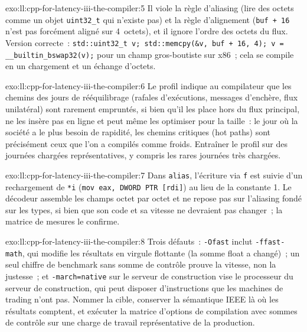 \begin{solution}{exo:ll:cpp-for-latency-iii-the-compiler:5} \sloppy
Il viole la règle d'aliasing (lire des octets comme un objet \texttt{uint32\_t} qui n'existe pas) et la règle d'alignement
(\texttt{buf + 16} n'est pas forcément aligné sur 4~octets), et il ignore l'ordre des octets du flux. Version correcte~:
\texttt{std::uint32\_t v; std::memcpy(\&v, buf + 16, 4); v = \_\_builtin\_bswap32(v);} pour un champ gros-boutiste sur x86~; cela se compile en un chargement et un
échange d'octets.
\end{solution}

\begin{solution}{exo:ll:cpp-for-latency-iii-the-compiler:6}
Le profil indique au compilateur que les chemins des jours de rééquilibrage (rafales d'exécutions, messages d'enchère, flux unilatéral) sont rarement empruntés,
si bien qu'il les place hors du flux principal, ne les insère pas en ligne et peut même les optimiser pour la taille~: le jour où la société a le plus besoin de rapidité,
les chemins critiques (hot paths) sont précisément ceux que l'on a compilés comme froids. Entraîner le profil sur des journées chargées représentatives, y compris les rares journées très chargées.
\end{solution}

\begin{solution}{exo:ll:cpp-for-latency-iii-the-compiler:7}
Dans \texttt{alias}, l'écriture via \texttt{f} est suivie d'un rechargement de \texttt{*i}
(\texttt{mov eax, DWORD PTR [rdi]}) au lieu de la constante 1. Le décodeur assemble les champs octet par octet et ne repose pas
sur l'aliasing fondé sur les types, si bien que son code et sa vitesse ne devraient pas changer~; la matrice de mesures le confirme.
\end{solution}

\begin{solution}{exo:ll:cpp-for-latency-iii-the-compiler:8}
Trois défauts~: \texttt{-Ofast} inclut \texttt{-ffast-math}, qui modifie les résultats en virgule flottante (la somme float a changé)~; un
seul chiffre de benchmark sans somme de contrôle prouve la vitesse, non la justesse~; et \texttt{-march=native} sur le serveur de construction
vise le processeur du serveur de construction, qui peut disposer d'instructions que les machines de trading n'ont pas. Nommer la cible, conserver la sémantique
IEEE là où les résultats comptent, et exécuter la matrice d'options de compilation avec sommes de contrôle sur une charge de travail représentative de la production.
\end{solution}

